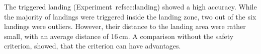 The triggered landing (Experiment~ref{sec:landing}) showed a high accuracy. While the majority of landings were triggered inside the landing zone, two out of the six landings were outliers. However, their distance to the landing area were rather small, with an average distance of 16\,cm. A comparison without the safety criterion, showed, that the criterion can have advantages. 